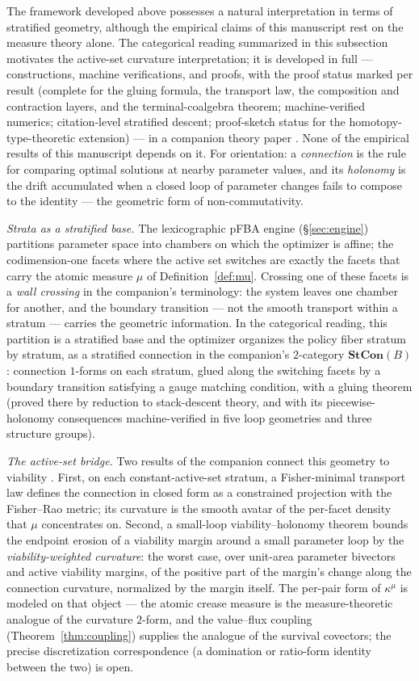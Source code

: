 \documentclass[11pt,a4paper]{article}
\theoremstyle{plain}
\theoremstyle{definition}
\theoremstyle{remark}
\newcommand{\kmu}{\kappa^{\mu}}
\begin{document}
The framework developed above possesses a natural interpretation in
terms of stratified geometry, although the empirical claims of this
manuscript rest on the measure theory alone. The categorical reading
summarized in this subsection motivates the active-set curvature
interpretation; it is developed in full ---
constructions, machine verifications, and proofs, with the proof
status marked per result (complete for the gluing formula, the
transport law, the composition and contraction layers, and the
terminal-coalgebra theorem; machine-verified numerics;
citation-level stratified descent; proof-sketch status for the
homotopy-type-theoretic extension) --- in a companion theory paper
\citep{zai2026categorical}. None of the empirical results of this
manuscript depends on it. For orientation: a \emph{connection} is
the rule for comparing optimal solutions at nearby parameter values,
and its \emph{holonomy} is the drift accumulated when a closed loop of
parameter changes fails to compose to the identity --- the geometric
form of non-commutativity.

\emph{Strata as a stratified base.} The lexicographic pFBA engine
(\S\ref{sec:engine}) partitions parameter space into chambers on
which the optimizer is affine; the codimension-one facets where the
active set switches are exactly the facets that carry the atomic
measure $\mu$ of Definition~\ref{def:mu}. Crossing one of these
facets is a \emph{wall crossing} in the companion's terminology:
the system leaves one chamber for another, and the boundary
transition --- not the smooth transport within a stratum --- carries
the geometric information. In the categorical reading,
this partition is a stratified base and the optimizer organizes the
policy fiber stratum by stratum, as a stratified connection in the
companion's $2$-category $\mathbf{StCon}(B)$: connection $1$-forms on
each stratum, glued along the switching facets by a boundary
transition satisfying a gauge matching condition, with a gluing
theorem (proved there by reduction to stack-descent theory, and with
its piecewise-holonomy consequences machine-verified in five loop
geometries and three structure groups).

\emph{The active-set bridge.} Two results of the companion connect
this geometry to viability \citep{zai2026categorical}. First, on
each constant-active-set stratum, a Fisher-minimal transport law
defines the connection in closed form as a constrained projection
with the Fisher--Rao metric; its curvature is the smooth avatar of
the per-facet density that $\mu$ concentrates on. Second, a
small-loop viability--holonomy theorem bounds the endpoint erosion
of a viability margin around a small parameter loop by the
\emph{viability-weighted curvature}:
the worst case, over unit-area parameter bivectors and active
viability margins, of the positive part of the margin's change along
the connection curvature, normalized by the margin itself. The
per-pair form of
$\kmu$ is modeled on that object --- the atomic crease measure is
the measure-theoretic analogue of the curvature $2$-form, and the
value--flux coupling (Theorem~\ref{thm:coupling}) supplies the
analogue of the survival covectors; the precise discretization
correspondence (a domination or ratio-form identity between the two)
is open.
\end{document}

